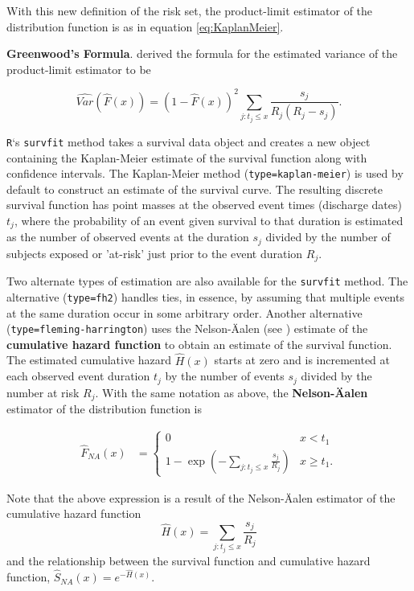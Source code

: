 \documentclass[]{book}
\theoremstyle{definition}
\theoremstyle{definition}
\theoremstyle{definition}
\theoremstyle{remark}
\begin{document}
With this new definition of the risk set, the product-limit estimator of
the distribution function is as in equation \eqref{eq:KaplanMeier}.

\textbf{Greenwood's Formula}. \citep{greenwood1926} derived the formula
for the estimated variance of the product-limit estimator to be

\[\widehat{Var}(\hat{F}(x)) = (1-\hat{F}(x))^{2} \sum _{j:t_{j} \leq x} \dfrac{s_j}{R_{j}(R_{j}-s_j)}.\]

\texttt{R}`s \texttt{survfit} method takes a survival data object and
creates a new object containing the Kaplan-Meier estimate of the
survival function along with confidence intervals. The Kaplan-Meier
method (\texttt{type=\textquotesingle{}kaplan-meier\textquotesingle{}})
is used by default to construct an estimate of the survival curve. The
resulting discrete survival function has point masses at the observed
event times (discharge dates) \(t_j\), where the probability of an event
given survival to that duration is estimated as the number of observed
events at the duration \(s_j\) divided by the number of subjects exposed
or 'at-risk' just prior to the event duration \(R_j\).

Two alternate types of estimation are also available for the
\texttt{survfit} method. The alternative
(\texttt{type=\textquotesingle{}fh2\textquotesingle{}}) handles ties, in
essence, by assuming that multiple events at the same duration occur in
some arbitrary order. Another alternative
(\texttt{type=\textquotesingle{}fleming-harrington\textquotesingle{}})
uses the Nelson-Äalen (see \citep{aalen1978}) estimate of the
\textbf{cumulative hazard function} to obtain an estimate of the
survival function. The estimated cumulative hazard \(\hat{H}(x)\) starts
at zero and is incremented at each observed event duration \(t_j\) by
the number of events \(s_j\) divided by the number at risk \(R_j\). With
the same notation as above, the \textbf{Nelson-Äalen} estimator of the
distribution function is

\[\begin{aligned}
\hat{F}_{NA}(x) &=
\left\{
\begin{array}{ll}
0 & x<t_{1} \\
1- \exp \left(-\sum_{j:t_{j} \leq x}\frac{s_j}{R_j} \right) & x \geq t_{1} .
\end{array}
\right.\end{aligned}\]

Note that the above expression is a result of the Nelson-Äalen estimator
of the cumulative hazard function
\[\hat{H}(x)=\sum_{j:t_j\leq x}  \frac{s_j}{R_j} \] and the relationship
between the survival function and cumulative hazard function,
\(\hat{S}_{NA}(x)=e^{-\hat{H}(x)}\).
\end{document}
